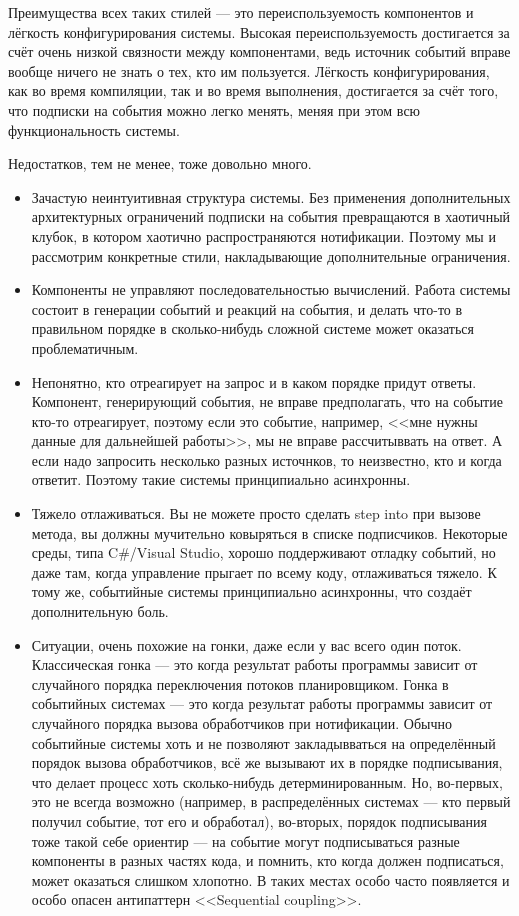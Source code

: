 \documentclass[a5paper]{article}
\begin{document}
Преимущества всех таких стилей --- это переиспользуемость компонентов и лёгкость конфигурирования системы. Высокая переиспользуемость достигается за счёт очень низкой связности между компонентами, ведь источник событий вправе вообще ничего не знать о тех, кто им пользуется. Лёгкость конфигурирования, как во время компиляции, так и во время выполнения, достигается за счёт того, что подписки на события можно легко менять, меняя при этом всю функциональность системы.

Недостатков, тем не менее, тоже довольно много.

\begin{itemize}
    \item Зачастую неинтуитивная структура системы. Без применения дополнительных архитектурных ограничений подписки на события превращаются в хаотичный клубок, в котором хаотично распространяются нотификации. Поэтому мы и рассмотрим конкретные стили, накладывающие дополнительные ограничения.
    \item Компоненты не управляют последовательностью вычислений. Работа системы состоит в генерации событий и реакций на события, и делать что-то в правильном порядке в сколько-нибудь сложной системе может оказаться проблематичным.
    \item Непонятно, кто отреагирует на запрос и в каком порядке придут ответы. Компонент, генерирующий события, не вправе предполагать, что на событие кто-то отреагирует, поэтому если это событие, например, <<мне нужны данные для дальнейшей работы>>, мы не вправе рассчитыввать на ответ. А если надо запросить несколько разных источнков, то неизвестно, кто и когда ответит. Поэтому такие системы принципиально асинхронны.
    \item Тяжело отлаживаться. Вы не можете просто сделать step into при вызове метода, вы должны мучительно ковыряться в списке подписчиков. Некоторые среды, типа C\#/Visual Studio, хорошо поддерживают отладку событий, но даже там, когда управление прыгает по всему коду, отлаживаться тяжело. К тому же, событийные системы принципиально асинхронны, что создаёт дополнительную боль.
    \item Ситуации, очень похожие на гонки, даже если у вас всего один поток. Классическая гонка --- это когда результат работы программы зависит от случайного порядка переключения потоков планировщиком. Гонка в событийных системах --- это когда результат работы программы зависит от случайного порядка вызова обработчиков при нотификации. Обычно событийные системы хоть и не позволяют закладывваться на определённый порядок вызова обработчиков, всё же вызывают их в порядке подписывания, что делает процесс хоть сколько-нибудь детерминированным. Но, во-первых, это не всегда возможно (например, в распределённых системах --- кто первый получил событие, тот его и обработал), во-вторых, порядок подписывания тоже такой себе ориентир --- на событие могут подписываться разные компоненты в разных частях кода, и помнить, кто когда должен подписаться, может оказаться слишком хлопотно. В таких местах особо часто появляется и особо опасен антипаттерн <<Sequential coupling>>.
\end{itemize}
\end{document}
